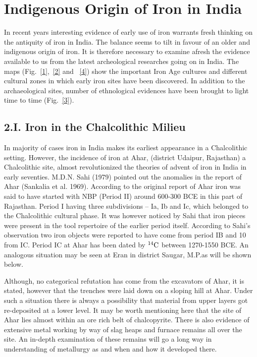 \section*{Indigenous Origin of Iron in India}\label{section-2}

In recent years interesting evidence of early use of iron warrants fresh thinking on the antiquity of iron in India. The balance seems to tilt in favour of an older and indigenous origin of iron. It is therefore necessary to examine afresh the evidence available to us from the latest archeological researches going on in India. The maps (Fig.~\ref{1},~\ref{2} and ~\ref{4}) show the important Iron Age cultures and different cultural zones in which early iron sites have been discovered. In addition to the archaeological sites, number of ethnological evidences have been brought to light time to time (Fig.~\ref{3}). 

\subsection*{2.I. Iron in the Chalcolithic Milieu}\label{subsection-4}

In majority of cases iron in India makes its earliest appearance in a Chalcolithic setting. However, the incidence of iron at Ahar, (district Udaipur, Rajasthan) a Chalcolithic site, almost revolutionized the theories of advent of iron in India in early seventies. M.D.N. Sahi (1979) pointed out the anomalies in the report of Ahar (Sankalia et al. 1969). According to the original report of Ahar iron was said to have started with NBP (Period II) around 600-300 BCE in this part of Rajasthan. Period I having three subdivisions – Ia, Ib and Ic, which belonged to the Chalcolithic cultural phase. It was however noticed by Sahi that iron pieces were present in the tool repertoire of the earlier period itself. According to Sahi’s observation two iron objects were reported to have come from period IB and 10 from IC. Period IC at Ahar has been dated by $^{14}{\rm C}$ between 1270-1550 BCE. An analogous situation may be seen at Eran in district Saugar, M.P.as will be shown below.

Although, no categorical refutation has come from the excavators of Ahar, it is stated, however that the trenches were laid down on a sloping hill at Ahar. Under such a situation there is always a possibility that material from upper layers got re-deposited at a lower level. It may be worth mentioning here that the site of Ahar lies almost within an ore rich belt of chalcopyrite. There is also evidence of extensive metal working by way of slag heaps and furnace remains all over the site. An in-depth examination of these remains will go a long way in understanding of metallurgy as and when and how it developed there.


